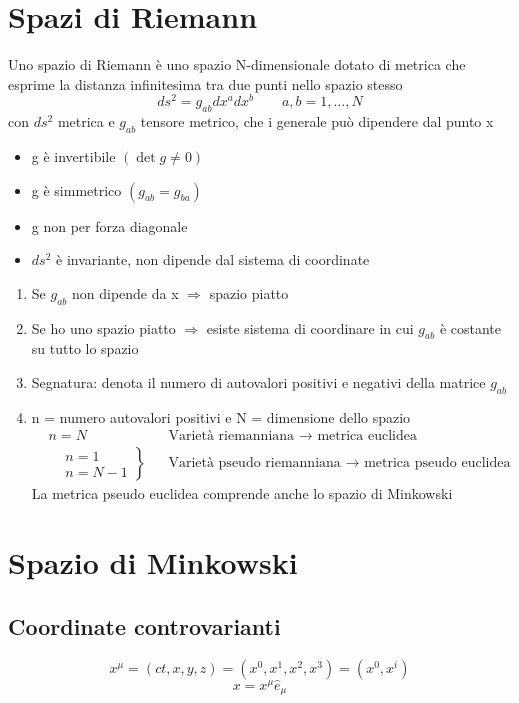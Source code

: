 \section{Spazi di Riemann}
Uno spazio di Riemann è uno spazio N-dimensionale dotato di metrica che esprime la distanza infinitesima tra due punti nello spazio stesso
\begin{equation*}
    ds^2 = g_{ab}dx^adx^b \qquad a,b = 1,\dots, N
\end{equation*}
con $ds^2$ metrica e $g_{ab}$ tensore metrico, che i generale può dipendere dal punto x
\begin{itemize}
    \item g è invertibile $(\det{g}\neq 0)$
    \item g è simmetrico $(g_{ab}=g_{ba})$
    \item g non per forza diagonale
    \item $ds^2$ è invariante, non dipende dal sistema di coordinate
\end{itemize}
\begin{enumerate}
    \item Se $g_{ab}$ non dipende da x $\Rightarrow$ spazio piatto
    \item Se ho uno spazio piatto $\Rightarrow$ esiste sistema di coordinare in cui $g_{ab}$ è costante su tutto lo spazio
    \item Segnatura: denota il numero di autovalori positivi e negativi della matrice $g_{ab}$
    \item n = numero autovalori positivi e N = dimensione dello spazio
    \begin{align*}
            &n = N && \text{Varietà riemanniana $\rightarrow$ metrica euclidea} \\
            &\left.
            \begin{aligned}
                &n = 1 \\
                &n = N-1 
            \end{aligned}
            \right\}
            && \text{Varietà pseudo riemanniana $\rightarrow$ metrica pseudo euclidea}
    \end{align*}
    La metrica pseudo euclidea comprende anche lo spazio di Minkowski
\end{enumerate}

\section{Spazio di Minkowski}
\subsection*{Coordinate controvarianti}
\begin{equation*}
    x^\mu = (ct,x,y,z) = (x^0,x^1,x^2,x^3) = (x^0,x^i)
\end{equation*}
\begin{equation*}
    x = x^\mu \hat{e}_\mu
\end{equation*}

